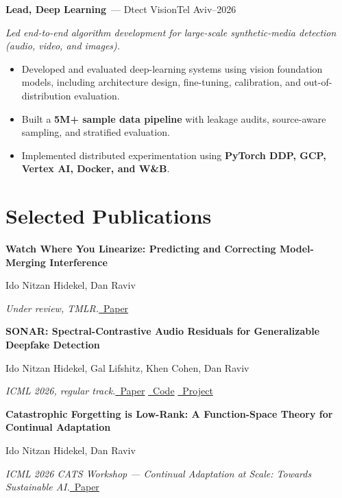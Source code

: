 \documentclass[10pt]{article}
\newcommand{\sep}{\enspace{\color{muted}|}\enspace}
\newcommand{\entry}[3]{\textbf{#1}{\color{muted}\ --- #2}\hfill{\color{muted}\small #3}\par}
\newcommand{\sub}[1]{{\color{muted}\small\itshape #1}\par}
\newcommand{\pub}[5]{%
  \textbf{#1}\par\vspace{2pt}
  {\color{muted}\small #2}\par\vspace{1pt}
  {\small{\color{accent}\itshape #3}\quad #4}\par}
\begin{document}
\entry{Lead, Deep Learning}{Dtect Vision}{Tel Aviv\sep 2025--2026}
\sub{Led end-to-end algorithm development for large-scale synthetic-media detection (audio, video, and images).}
\begin{itemize}
  \item Developed and evaluated deep-learning systems using vision foundation models, including architecture design,
        fine-tuning, calibration, and out-of-distribution evaluation.
  \item Built a \textbf{5M+ sample data pipeline} with leakage audits, source-aware sampling, and stratified evaluation.
  \item Implemented distributed experimentation using \textbf{PyTorch DDP, GCP, Vertex AI, Docker, and W\&B}.
\end{itemize}

\section{Selected Publications}
\pub{Watch Where You Linearize: Predicting and Correcting Model-Merging Interference}
    {Ido Nitzan Hidekel, Dan Raviv}
    {Under review, TMLR.}
    {\href{https://arxiv.org/abs/2611.25000}{\faFilePdf\ Paper}}
    {Showed that a first-order directional derivative of one task's outputs along another task's vector predicts
     model-merging interference per task and per example, when evaluated at the right model.}
\vspace{6pt}

\pub{SONAR: Spectral-Contrastive Audio Residuals for Generalizable Deepfake Detection}
    {Ido Nitzan Hidekel, Gal Lifshitz, Khen Cohen, Dan Raviv}
    {ICML 2026, regular track.}
    {\href{https://arxiv.org/abs/2511.21325}{\faFilePdf\ Paper}\sep
     \href{https://github.com/idonithid/SONAR-Audio-DF-Detection}{\faGithub\ Code}\sep
     \href{https://idonithid.github.io/SONAR-Audio-DF-Detection/}{\faExternalLink*\ Project}}
    {Developed an XLSR-based dual-path detector combining content and learnable residual representations. Achieved
     1.45\% EER on ASVspoof 2021 DF and 5.43\% EER on In-the-Wild, with robustness to codec and bandwidth shifts.}
\vspace{6pt}

\pub{Catastrophic Forgetting is Low-Rank: A Function-Space Theory for Continual Adaptation}
    {Ido Nitzan Hidekel, Dan Raviv}
    {ICML 2026 CATS Workshop --- Continual Adaptation at Scale: Towards Sustainable AI.}
    {\href{https://arxiv.org/abs/2606.18024}{\faFilePdf\ Paper}}
    {Developed a function-space predictor for catastrophic forgetting and showed that forgetting concentrates in a small
     number of dominant functional modes, motivating targeted regularization methods.}
\end{document}
